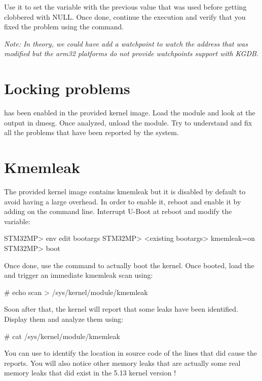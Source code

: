 Use it to set the variable with the previous value that was used before getting
clobbered with NULL. Once done, continue the execution and verify that you fixed
the problem using the  command.

{\em Note: In theory, we could have add a watchpoint to watch the address that
was modified but the arm32 platforms do not provide watchpoints support with
KGDB.}

\section{Locking problems}

 has been enabled in the provided kernel image.
Load the  module and look at the output in dmesg. Once
analyzed, unload the module. Try to understand and fix all the problems that
have been reported by the  system.

\section{Kmemleak}

The provided kernel image contains kmemleak but it is disabled by default to
avoid having a large overhead. In order to enable it, reboot and enable it by
adding  on the command line. Interrupt U-Boot at reboot and
modify the  variable:

\begin{bashinput}
STM32MP> env edit bootargs
STM32MP> <existing bootargs> kmemleak=on
STM32MP> boot
\end{bashinput}

Once done, use the  command to actually boot the kernel. Once booted,
load the  and trigger an immediate kmemleak scan using:

\begin{bashinput}
# echo scan > /sys/kernel/module/kmemleak
\end{bashinput}

Soon after that, the kernel will report that some leaks have been identified.
Display them and analyze them using:

\begin{bashinput}
# cat /sys/kernel/module/kmemleak
\end{bashinput}

You can use  to identify the location in source code of the
lines that did cause the reports. You will also notice other memory leaks that
are actually some real memory leaks that did exist in the 5.13 kernel version !


